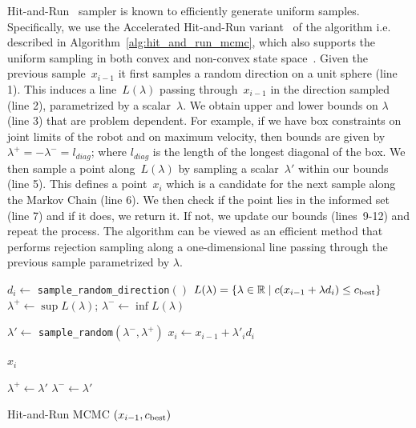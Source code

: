 \documentclass[letterpaper, 10 pt, conference]{ieeeconf}  %
\begin{document}
Hit-and-Run~\cite{S84} sampler is known to efficiently generate uniform samples. 
Specifically, we use the Accelerated Hit-and-Run variant~\cite{KSZ11} of the algorithm i.e. described in Algorithm~\ref{alg:hit_and_run_mcmc}, which also supports the uniform sampling in both convex and non-convex state space~\cite{KSZ11}.
Given the previous sample~$x_{i-1}$ it first  samples a random direction on a unit sphere (line 1).
This induces a line~$L(\lambda)$ passing through~$x_{i-1}$ in the direction sampled (line 2), parametrized by a scalar~$\lambda$.
We obtain upper and lower bounds on $\lambda$ (line 3) that are problem dependent. 
For example, if we have box constraints on joint limits of the robot and on maximum velocity, then bounds are given by $\lambda^{+} = -\lambda^{-} = l_{diag}$; where $l_{diag}$ is the length of the longest diagonal of the box.
We then sample a point along~$L(\lambda)$ by sampling a scalar~$\lambda'$ within our bounds (line 5).
This defines a point~$x_{i}$ which is a candidate for the next sample along the Markov Chain (line 6).
We then check if the point lies in the informed set (line 7) and if it does, we return it.
If not, we update our bounds (lines~9-12) and repeat the process.
The algorithm can be viewed as an efficient method that performs rejection sampling along a one-dimensional line passing through the previous sample parametrized by $\lambda$.

\begin{algorithm}[t]
	\begin{algorithmic}[1]
		\STATE $d_i \leftarrow$ \texttt{sample\_random\_direction}$()$
		\STATE $ L(\lambda) = \{  \lambda \in \mathbb{R} \mid c(x_{i-1} + \lambda d_i ) \leq c_{\rm best} \} $
		\STATE $ \lambda^{+} \leftarrow \sup L(\lambda) $; 
		\hspace{3mm} 
		$ \lambda^{-} \leftarrow \inf L(\lambda) $
		
		\LOOP
		
		\STATE $ \lambda' \leftarrow$ \texttt{sample\_random}$ (\lambda^{-} , \lambda^{+})$
		\STATE $ x_{i} \leftarrow x_{i-1} + \lambda'_{i} d_i $
		
		\RETURN $ x_{i}$
		\ENDIF
		
		\STATE $ \lambda^{+} \leftarrow \lambda' $
		\ELSE
		\STATE $ \lambda^{-} \leftarrow \lambda'$
		\ENDIF
		
		\ENDLOOP
	\end{algorithmic}
	\caption{\captionstyle Hit-and-Run MCMC $(x_{i-1}, c_{\rm best})$}
	\label{alg:hit_and_run_mcmc}	
\end{algorithm}
\end{document}

